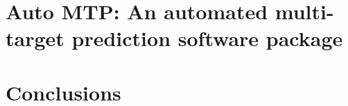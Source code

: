 \documentclass[]{beamer}
\renewcommand{\alert}[1]{\textbf{\color{putblue} #1}}
\begin{document}
%
%


\section{Auto MTP: An automated multi-target prediction software package}


\section{Conclusions}
\end{document}
